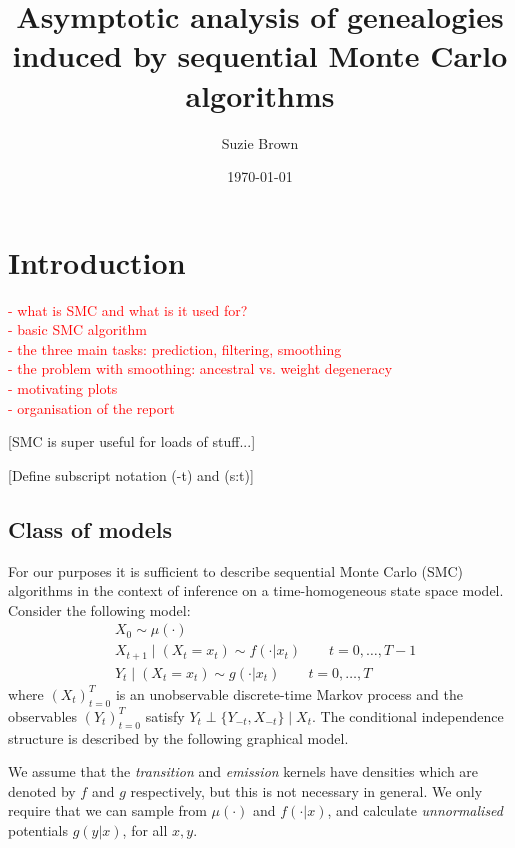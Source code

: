 \documentclass[fleqn]{article}
\title{Asymptotic analysis of genealogies induced by sequential Monte Carlo algorithms}
\author{Suzie Brown}
\date{\today}
\newcommand{\indep}{\perp}
\begin{document}
\maketitle
\thispagestyle{fancy}

\section{Introduction}
\textcolor{red}{
- what is SMC and what is it used for?\\
- basic SMC algorithm\\
- the three main tasks: prediction, filtering, smoothing\\
- the problem with smoothing: ancestral vs. weight degeneracy\\
- motivating plots\\
- organisation of the report\\
}

[SMC is super useful for loads of stuff...]

[Define subscript notation (-t) and (s:t)]

\subsection{Class of models}
For our purposes it is sufficient to describe sequential Monte Carlo (SMC) algorithms in the context of inference on a time-homogeneous state space model.
Consider the following model:
\begin{align*}
& X_0 \sim \mu(\cdot) \\
& X_{t+1} \mid (X_t = x_t) \sim f(\cdot | x_t)  \qquad t=0,\dots,T-1 \\
& Y_t \mid (X_t = x_t) \sim g(\cdot | x_t) \qquad t=0,\dots,T
\end{align*}
where $(X_t)_{t=0}^T$ is an unobservable discrete-time Markov process and the observables $(Y_t)_{t=0}^T$ satisfy $Y_t \indep \{Y_{-t}, X_{-t}\} \mid X_t$. 
The conditional independence structure is described by the following graphical model.
\begin{center}
\end{center}
We assume that the \emph{transition} and \emph{emission} kernels have densities which are denoted by $f$ and $g$ respectively, but this is not necessary in general.
We only require that we can sample from $\mu(\cdot)$ and $f(\cdot | x)$, and calculate \emph{unnormalised} potentials $g(y|x)$, for all $x,y$.
\end{document}
